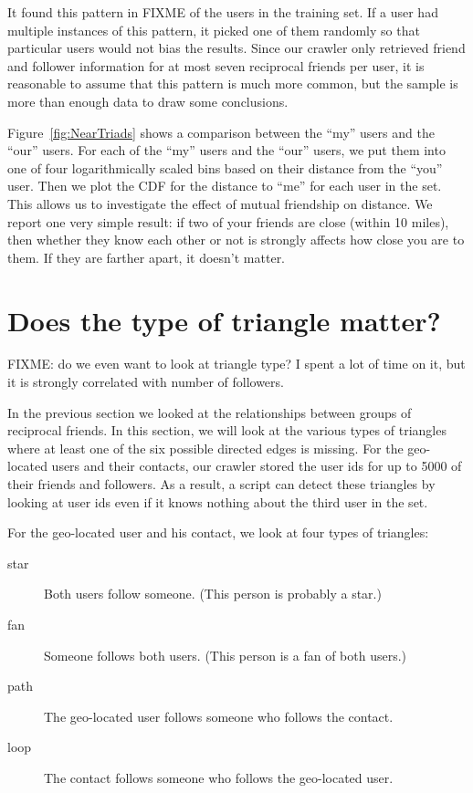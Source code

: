 It found this pattern in FIXME of the users in the training set.
If a user had multiple instances of this pattern, it picked one of them
randomly so that particular users would not bias the results.
Since our crawler only retrieved friend and follower information for at most
seven reciprocal friends per user, it is reasonable to assume that this pattern
is much more common, but the sample is more than enough data to draw some
conclusions.

Figure~\ref{fig:NearTriads} shows a comparison between the ``my'' users and the
``our'' users.
For each of the ``my'' users and the ``our'' users, we put them into one of
four logarithmically scaled bins based on their distance from the ``you'' user.
Then we plot the CDF for the distance to ``me'' for each user in the set. This
allows us to investigate the effect of mutual friendship on distance.
We report one very simple result: if two of your friends are close (within 10
miles), then whether they know each other or not is strongly affects how close
you are to them. If they are farther apart, it doesn't matter.

\section{Does the type of triangle matter?}

FIXME: do we even want to look at triangle type? I spent a lot of time on it,
but it is strongly correlated with number of followers.

In the previous section we looked at the relationships between groups of
reciprocal friends.
In this section, we will look at the various types of triangles where at least
one of the six possible directed edges is missing.
For the geo-located users and their contacts, our crawler stored the user ids
for up to 5000 of their friends and followers.
As a result, a script can detect these triangles by looking at user ids even if
it knows nothing about the third user in the set.

For the geo-located user and his contact, we look at four types of triangles:
\begin{description}
\item[star] Both users follow someone. (This person is probably a star.)
\item[fan] Someone follows both users. (This person is a fan of both users.)
\item[path] The geo-located user follows someone who follows the contact.
\item[loop] The contact follows someone who follows the geo-located user.
\end{description}

